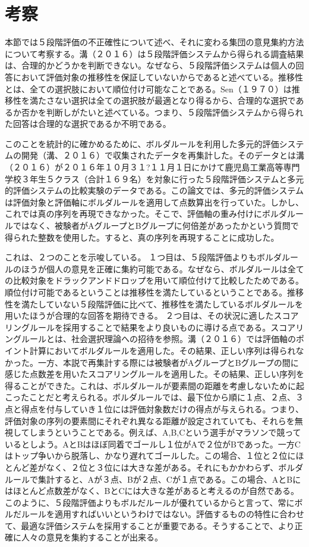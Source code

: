 \documentclass[11pt,a4paper]{jsarticle}
\begin{document}
\section{考察}
本節では５段階評価の不正確性について述べ、それに変わる集団の意見集約方法について考察する。溝（２０１６）は５段階評価システムから得られる調査結果は、合理的かどうかを判断できない。なぜなら、５段階評価システムは個人の回答において評価対象の推移性を保証していないからであると述べている。推移性とは、全ての選択肢において順位付け可能なことである。Sen（１９７０）は推移性を満たさない選択は全ての選択肢が最適となり得るから、合理的な選択であるか否かを判断しがたいと述べている。つまり、５段階評価システムから得られた回答は合理的な選択であるか不明である。

このことを統計的に確かめるために、ボルダルールを利用した多元的評価システムの開発（溝、２０１６）で収集されたデータを再集計した。そのデータとは溝（２０１６）が２０１６年１０月３１?１１月１日にかけて鹿児島工業高等専門学校３年生５クラス（合計１６９名）を対象に行った５段階評価システムと多元的評価システムの比較実験のデータである。この論文では、多元的評価システムは評価対象と評価軸にボルダルールを適用して点数算出を行っていた。しかし、これでは真の序列を再現できなかった。そこで、評価軸の重み付けにボルダルールではなく、被験者がAグループとBグループに何倍差があったかという質問で得られた整数を使用した。すると、真の序列を再現することに成功した。

これは、２つのことを示唆している。
１つ目は、５段階評価よりもボルダルールのほうが個人の意見を正確に集約可能である。なぜなら、ボルダルールは全ての比較対象をドラックアンドドロップを用いて順位付けて比較したためである。順位付け可能であるということは推移性を満たしているということである。推移性を満たしていない５段階評価に比べて、推移性を満たしているボルダルールを用いたほうが合理的な回答を期待できる。
２つ目は、その状況に適したスコアリングルールを採用することで結果をより良いものに導ける点である。スコアリングルールとは、社会選択理論への招待を参照。溝（２０１６）では評価軸のポイント計算においてボルダルールを適用した。その結果、正しい序列は得られなかった。一方、本説で再集計する際には被験者がAグループとBグループの間に感じた点数差を用いたスコアリングルールを適用した。その結果、正しい序列を得ることができた。これは、ボルダルールが要素間の距離を考慮しないために起こったことだと考えられる。ボルダルールでは、最下位から順に１点、２点、３点と得点を付与していき１位には評価対象数だけの得点が与えられる。つまり、評価対象の序列の要素間にそれぞれ異なる距離が設定されていても、それらを無視してしまうということである。例えば、A,B,Cという選手がマラソンで競っているとしよう。AとBはほぼ同着でゴールし１位がAで２位がBであった。一方Cはトップ争いから脱落し、かなり遅れてゴールした。この場合、１位と２位にほとんど差がなく、２位と３位には大きな差がある。それにもかかわらず、ボルダルールで集計すると、Aが３点、Bが２点、Cが１点である。この場合、AとBにはほとんど点数差がなく、BとCには大きな差があると考えるのが自然である。このように、５段階評価よりもボルだルールが優れているからと言って、常にボルだルールを適用すればいいというわけではない。評価するものの特性に合わせて、最適な評価システムを採用することが重要である。そうすることで、より正確に人々の意見を集約することが出来る。
\end{document}
